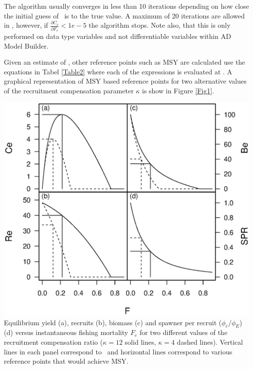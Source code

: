 \begin{multicols}{2}
The algorithm usually converges in less than 10 iterations depending on how close the initial guess of \fmsy\ is to the true value.  A maximum of 20 iterations are allowed in \iscam, however, if $\frac{\partial C_e}{\partial F_e}<1e-5$ the algorithm stops.  Note also, that this is only performed on data type variables and not differentiable variables within AD Model Builder.

Given an estimate of \fmsy, other reference points such as MSY are calculated use the equations in Tabel \ref{Table2} where each of the expressions is evaluated at \fmsy.  A graphical representation of MSY based reference points for two alternative values of the recruitment compensation parameter $\kappa$ is show in Figure \ref{Fig1}.

\begin{figurehere}
  \centering
  \includegraphics[width=\columnwidth]{iscamFigs/Fig1.Quadplot.eps}\\
  \caption{Equilibrium yield (a), recruits (b), biomass (c) and
spawner per recruit ($\phi_e/\phi_E$) (d) versus instantaneous
fishing mortality $F_e$ for two different values of the recruitment
compensation ratio ($\kappa=12$ solid lines, $\kappa=4$ dashed
lines). Vertical lines in each panel correspond to \fmsy\ and
horizontal lines correspond to various reference points that would
achieve MSY.}\label{Fig1}
\end{figurehere}



\end{multicols}
